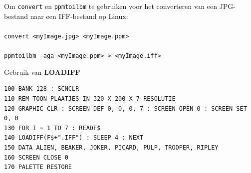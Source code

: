 \begin{description}[leftmargin=2cm,style=nextline]
                  Om \texttt{convert} en \texttt{ppmtoilbm} te gebruiken voor het converteren van een JPG-bestand naar een IFF-bestand op Linux: \\
                  \\
                  \texttt{convert <myImage.jpg> <myImage.ppm>} \\
                  \\
                  \texttt{ppmtoilbm -aga <myImage.ppm> > <myImage.iff>}

\item [Voorbeeld:]  Gebruik van {\bf LOADIFF}

\begin{tcolorbox}[colback=black,coltext=white]
\verbatimfont{\codefont}
\begin{verbatim}
100 BANK 128 : SCNCLR
110 REM TOON PLAATJES IN 320 X 200 X 7 RESOLUTIE
120 GRAPHIC CLR : SCREEN DEF 0, 0, 0, 7 : SCREEN OPEN 0 : SCREEN SET 0, 0
130 FOR I = 1 TO 7 : READF$
140 LOADIFF(F$+".IFF") : SLEEP 4 : NEXT
150 DATA ALIEN, BEAKER, JOKER, PICARD, PULP, TROOPER, RIPLEY
160 SCREEN CLOSE 0
170 PALETTE RESTORE
\end{verbatim}
\end{tcolorbox}
\end{description}


\newpage
